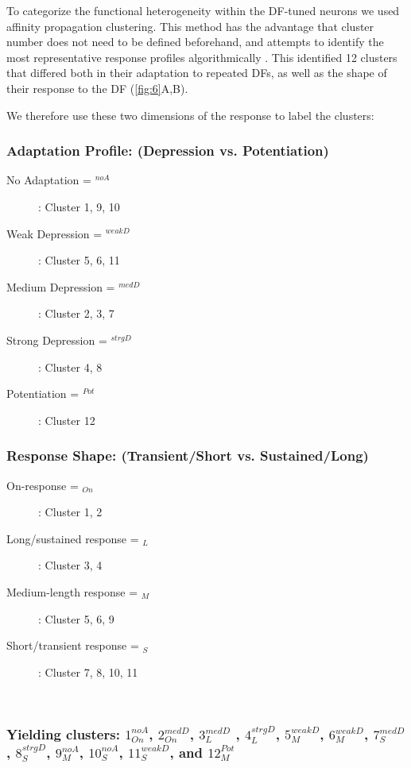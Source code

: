 \documentclass[9pt,lineno]{RandlettLab_elife}
\begin{document}
To categorize the functional heterogeneity within the DF-tuned neurons we used affinity propagation clustering. This method has the advantage that cluster number does not need to be defined beforehand, and attempts to identify the most representative response profiles algorithmically \cite{Forster2020-lg}.  This identified 12 clusters that differed both in their adaptation to repeated DFs, as well as the shape of their response to the DF (\autoref{fig:6}A,B). 

We therefore use these two dimensions of the response to label the clusters:

\subsubsection{Adaptation Profile:  (Depression vs. Potentiation)}


\begin{description}
\item[No Adaptation = $^{noA}$ ]    : 	Cluster 1, 9, 10
\item[Weak Depression = $^{weakD}$ ]    : 	Cluster 5, 6, 11
\item[Medium Depression = $^{medD}$ ]    : 	Cluster 2, 3, 7
\item[Strong Depression = $^{strgD}$ ]    : 	Cluster 4, 8
\item[Potentiation = $^{Pot}$ ]    : 	Cluster 12
\end{description}



\subsubsection{Response Shape: (Transient/Short vs. Sustained/Long)}
\begin{description}
\item[On-response = $_{On}$]    : 	Cluster 1, 2
\item[Long/sustained response = $_{L}$]    : 	Cluster 3, 4
\item[Medium-length response = $_{M}$]    : 	Cluster 5, 6, 9
\item[Short/transient response = $_{S}$]    : 	Cluster 7, 8, 10, 11

\end{description}
\\
\subsubsection{Yielding clusters: $1_{On}^{noA}$, $2_{On}^{medD}$, $3_{L}^{medD}$ , $4_{L}^{strgD}$, $5_{M}^{weakD}$, $6_{M}^{weakD}$, $7_{S}^{medD}$, $8_{S}^{strgD}$, $9_{M}^{noA}$, $10_{S}^{noA}$, $11_{S}^{weakD}$, and $12_{M}^{Pot}$}
\end{document}
